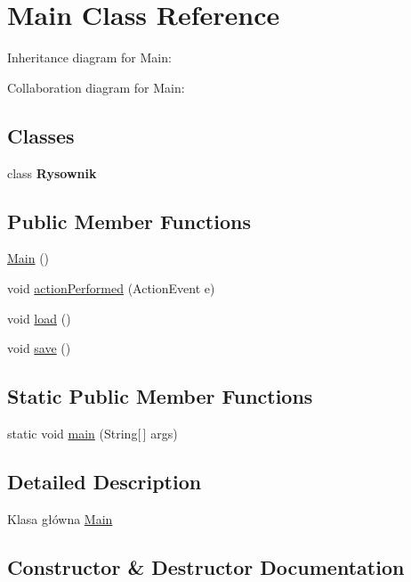 \hypertarget{classMain}{}\section{Main Class Reference}
\label{classMain}


Inheritance diagram for Main\+:


Collaboration diagram for Main\+:
\subsection*{Classes}
\begin{DoxyCompactItemize}
\item 
class {\bfseries Rysownik}
\end{DoxyCompactItemize}
\subsection*{Public Member Functions}
\begin{DoxyCompactItemize}
\item 
\hyperlink{classMain_a86df60b74e5d667547357dc7935b4b70}{Main} ()
\item 
void \hyperlink{classMain_a3d2ff6cffa842e69ecb86cc3a14db1ea}{action\+Performed} (Action\+Event e)
\item 
void \hyperlink{classMain_a96bc6cc684f0634dd93d7fd242e4e96c}{load} ()
\item 
void \hyperlink{classMain_a38db5baccd60e4fc73197f5b052af93f}{save} ()
\end{DoxyCompactItemize}
\subsection*{Static Public Member Functions}
\begin{DoxyCompactItemize}
\item 
static void \hyperlink{classMain_a8a5d0f827edddff706cc0e6740d0579a}{main} (String\mbox{[}$\,$\mbox{]} args)
\end{DoxyCompactItemize}


\subsection{Detailed Description}
Klasa główna \hyperlink{classMain}{Main} 

\subsection{Constructor \& Destructor Documentation}
\mbox{\label{classMain_a86df60b74e5d667547357dc7935b4b70}} 
